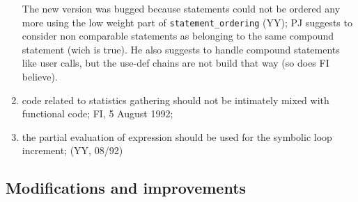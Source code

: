 \begin{enumerate}
The new version was bugged because statements could not be ordered
any more using the low weight part of \verb+statement_ordering+ (YY);
PJ suggests to consider non comparable statements as belonging to
the same compound statement (wich is true). He also suggests to
handle compound statements like user calls, but the use-def chains
are not build that way (so does FI believe).

  \item code related to statistics gathering should not be intimately
        mixed with functional code; FI, 5 August 1992;

  \item the partial evaluation of expression should be used for the
        symbolic loop increment; (YY, 08/92) 
\end{enumerate}

\subsection{Modifications and improvements}

